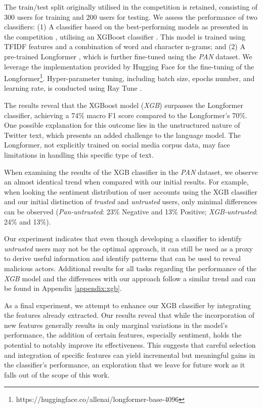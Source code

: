 The train/test split originally utilised in the competition is retained, consisting of 300 users for training and 200 users for testing. We assess the performance of two classifiers: (1) A classifier based on the best-performing models as presented in the competition \cite{buda2020ensemble, pizarro2020}, utilising an XGBoost classifier \cite{chen2016xgboost}. This model is trained using TFIDF features and a combination of word and character n-grams; and (2) A pre-trained Longformer \cite{beltagy2020longformer}, which is further fine-tuned using the \textit{PAN} dataset. We leverage the implementation provided by Hugging Face \cite{wolf-etal-2020-transformers} for the fine-tuning of the Longformer\footnote{https://huggingface.co/allenai/longformer-base-4096}. Hyper-parameter tuning, including batch size, epochs number, and learning rate, is conducted using Ray Tune \cite{liaw2018tune}.

The results reveal that the XGBoost model (\textit{XGB}) surpasses the Longformer classifier, achieving a 74\% macro F1 score compared to the Longformer's 70\%. One possible explanation for this outcome lies in the unstructured nature of Twitter text, which presents an added challenge to the language model. The Longformer, not explicitly trained on social media corpus data, may face limitations in handling this specific type of text.


When examining the results of the XGB classifier  in the \textit{PAN} dataset, we observe an almost identical trend when compared with our initial results. For example, when looking the sentiment distribution of user accounts using the XGB classifier and our initial distinction of \textit{trusted} and \textit{untrusted} users, only minimal differences can be observed (\textit{Pan-untrusted}: 23\% Negative and 13\% Positive; \textit{XGB-untrusted}: 24\% and 13\%).

Our experiment indicates that even though developing a classifier to identify \textit{untrusted} users may not be the optimal approach, it can still be used as a proxy to derive useful information and identify patterns that can be used to reveal malicious actors. 
Additional results for all tasks regarding the performance of the \textit{XGB} model and the differences with our approach follow a similar trend and can be found in Appendix \ref{appendix:xgb}.

As a final experiment, we attempt to enhance our XGB classifier by integrating the features already extracted. Our results %
reveal that while the incorporation of new features generally results in only marginal variations in the model's performance, the addition of certain features, especially sentiment, holds the potential to notably improve its effectiveness. This suggests that careful selection and integration of specific features can yield incremental but meaningful gains in the classifier's performance, an exploration that we leave for future work as it falls out of the scope of this work.



